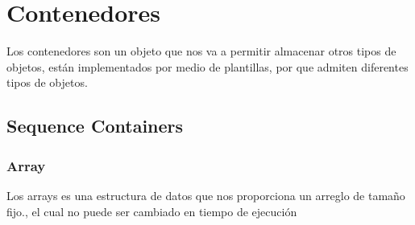 \section{Contenedores}

Los contenedores son un objeto que nos va  a permitir almacenar otros tipos de objetos, están implementados por medio de plantillas, por que admiten diferentes tipos de objetos.

\subsection{Sequence Containers}

\subsubsection{Array}

Los arrays es una estructura de datos que nos proporciona un arreglo de tamaño fijo., el cual no puede ser cambiado en tiempo de ejecución